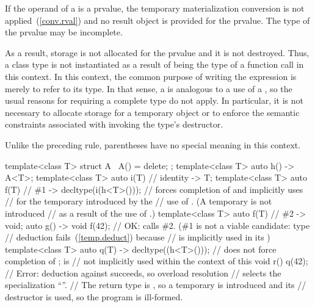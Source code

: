 \pnum
If the operand of a  is a prvalue,
the temporary materialization conversion is not applied~(\ref{conv.rval})
and no result object is provided for the prvalue.
The type of the prvalue may be incomplete.
\begin{note}
As a result, storage is not allocated for the prvalue and it is not destroyed.
Thus, a class type is not instantiated
as a result of being the type of a function call in this context. 
In this context, the common purpose of
writing the expression is merely to refer to its type. In that sense, a
 is analogous to a use of a ,
so the usual reasons for requiring a complete type do not apply. In particular,
it is not necessary to allocate storage for a temporary object or to enforce the
semantic constraints associated with invoking the type's destructor.
\end{note}
\begin{note}
Unlike the preceding rule, parentheses have no special meaning in this context.
\end{note}
\begin{example}
\begin{codeblock}
template<class T> struct A { ~A() = delete; };
template<class T> auto h()
  -> A<T>;
template<class T> auto i(T)     // identity
  -> T;
template<class T> auto f(T)     // \#1
  -> decltype(i(h<T>()));       // forces completion of  and implicitly uses
                                //  for the temporary introduced by the
                                // use of . (A temporary is not introduced
                                // as a result of the use of .)
template<class T> auto f(T)     // \#2
  -> void;
auto g() -> void {
  f(42);                        // OK: calls \#2. (\#1 is not a viable candidate: type
                                // deduction fails~(\ref{temp.deduct}) because 
                                // is implicitly used in its )
}
template<class T> auto q(T)
  -> decltype((h<T>()));        // does not force completion of ;  is
                                // not implicitly used within the context of this 
void r() {
  q(42);                        // Error: deduction against  succeeds, so overload resolution
                                // selects the specialization ``''.
                                // The return type is , so a temporary is introduced and its
                                // destructor is used, so the program is ill-formed.
}
\end{codeblock}
\end{example}

